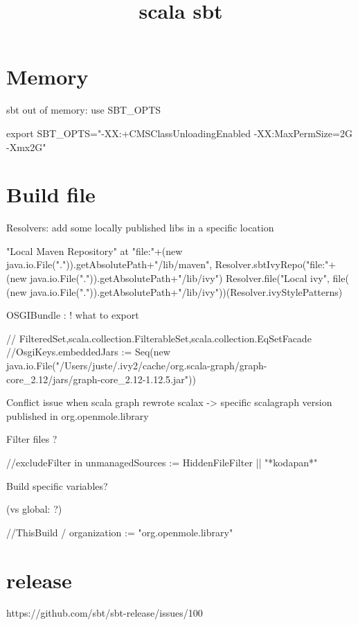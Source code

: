 


\title{scala sbt}


\date{}


\maketitle

\justify

\renewcommand{\abstractname}{}

\begin{abstract}

\end{abstract}


\section*{Memory}

sbt out of memory: use SBT_OPTS

export SBT_OPTS="-XX:+CMSClassUnloadingEnabled -XX:MaxPermSize=2G -Xmx2G"




\section*{Build file}


Resolvers: add some locally published libs in a specific location

"Local Maven Repository" at "file:"+(new java.io.File(".")).getAbsolutePath+"/lib/maven",
 Resolver.sbtIvyRepo("file:"+(new java.io.File(".")).getAbsolutePath+"/lib/ivy")
 Resolver.file("Local ivy", file( (new java.io.File(".")).getAbsolutePath+"/lib/ivy"))(Resolver.ivyStylePatterns)


OSGIBundle : ! what to export

  // FilteredSet,scala.collection.FilterableSet,scala.collection.EqSetFacade
  //OsgiKeys.embeddedJars := Seq(new java.io.File("/Users/juste/.ivy2/cache/org.scala-graph/graph-core_2.12/jars/graph-core_2.12-1.12.5.jar"))

Conflict issue when scala graph rewrote scalax -> specific scalagraph version published in org.openmole.library



Filter files ?

//excludeFilter in unmanagedSources := HiddenFileFilter || "*kodapan*"


Build specific variables? 

(vs global: ?)

//ThisBuild / organization := "org.openmole.library"


\section*{release}

https://github.com/sbt/sbt-release/issues/100



%
%



